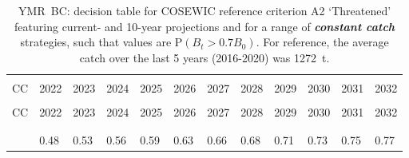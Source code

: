 \documentclass[11pt]{book}
\newcommand{\itbf}[1]{\textit{\textbf{#1}}}
\begin{document}
\begin{longtable}[c]{>{\raggedright\let\newline\\\arraybackslash\hspace{0pt}}p{0.52in}>{\raggedleft\let\newline\\\arraybackslash\hspace{0pt}}p{0.52in}>{\raggedleft\let\newline\\\arraybackslash\hspace{0pt}}p{0.52in}>{\raggedleft\let\newline\\\arraybackslash\hspace{0pt}}p{0.52in}>{\raggedleft\let\newline\\\arraybackslash\hspace{0pt}}p{0.52in}>{\raggedleft\let\newline\\\arraybackslash\hspace{0pt}}p{0.52in}>{\raggedleft\let\newline\\\arraybackslash\hspace{0pt}}p{0.52in}>{\raggedleft\let\newline\\\arraybackslash\hspace{0pt}}p{0.52in}>{\raggedleft\let\newline\\\arraybackslash\hspace{0pt}}p{0.52in}>{\raggedleft\let\newline\\\arraybackslash\hspace{0pt}}p{0.52in}>{\raggedleft\let\newline\\\arraybackslash\hspace{0pt}}p{0.52in}>{\raggedleft\let\newline\\\arraybackslash\hspace{0pt}}p{0.52in}}
  \caption{YMR~BC: decision table for COSEWIC reference criterion A2 `Threatened' featuring current- and 10-year projections and for a range of \itbf{constant catch} strategies, such that values are P$(B_t > 0.7 B_0)$. For reference, the average catch over the last 5 years (2016-2020) was 1272~t. } \label{tab:ymr.cosewic.70B0.CCs}\\  \hline\\[-2.2ex]  CC  & 2022 & 2023 & 2024 & 2025 & 2026 & 2027 & 2028 & 2029 & 2030 & 2031 & 2032 \\[0.2ex]\hline\\[-1.5ex]  \endfirsthead   \hline  CC  & 2022 & 2023 & 2024 & 2025 & 2026 & 2027 & 2028 & 2029 & 2030 & 2031 & 2032 \\[0.2ex]\hline\\[-1.5ex]  \endhead  \hline\\[-2.2ex]   \endfoot  \hline \endlastfoot  0 & 0.48 & 0.53 & 0.56 & 0.59 & 0.63 & 0.66 & 0.68 & 0.71 & 0.73 & 0.75 & 0.77 \\ 

\end{longtable}
\end{document}
